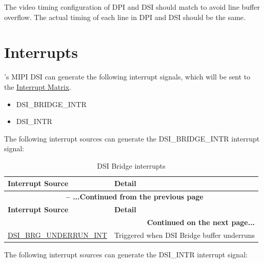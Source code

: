 \documentclass[main\_\_EN.tex]{subfiles}
\begin{document}
The video timing configuration of DPI and DSI should match to avoid line buffer overflow. The actual timing of each line in DPI and DSI should be the same.


\section{Interrupts}
\chipname{}'s MIPI DSI can generate the following interrupt signals, which will be sent to the \hyperref[mod:intmtrx]{Interrupt Matrix}.

\begin{itemize}
    \item DSI\_BRIDGE\_INTR
    \item DSI\_INTR
\end{itemize}

The following interrupt sources can generate the DSI\_BRIDGE\_INTR interrupt signal:

\begin{longtable}[c]{ |p{5cm}|p{10cm}| }
    \caption{DSI Bridge interrupts}
    \label{tab:dsi-bridge-intr}\\\hline

    \rowcolor{lightgray}
    \textbf{Interrupt Source} & \textbf{Detail} \\\hline
    \endfirsthead


    \multicolumn{2}{c}{\bfseries \tablename\ \thetable{} -- ...Continued from the previous page}\\\hline
    \rowcolor{lightgray}
    \textbf{Interrupt Source} & \textbf{Detail} \\\hline
    \endhead

    \multicolumn{2}{r}{\textbf{Continued on the next page...}} \\
    \endfoot

    \endlastfoot

    \hyperref[fielddesc:DSIBRGUNDERRUNINTRAW]{DSI\_BRG\_UNDERRUN\_INT} & Triggered when DSI Bridge buffer underruns \\\hline
        

\end{longtable}

The following interrupt sources can generate the DSI\_INTR interrupt signal:
\end{document}
